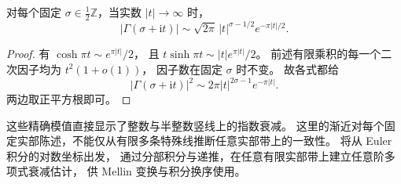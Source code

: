 \begin{corollary}[整数与半整数竖线的渐近]\label{b3:cor:21-half-integer-lines}
对每个固定 \(\sigma\in\tfrac12\mathbb Z\)，当实数 \(|t|\to\infty\) 时，
\[
 |\Gamma(\sigma+\mathrm it)|
 \sim\sqrt{2\pi}\,|t|^{\sigma-1/2}e^{-\pi|t|/2}.
\]
\end{corollary}
\begin{proof}
有 \(\cosh\pi t\sim e^{\pi|t|}/2\)，
且 \(t\sinh\pi t\sim|t|e^{\pi|t|}/2\)。
前述有限乘积的每一个二次因子均为 \(t^2(1+o(1))\)，
因子数在固定 \(\sigma\) 时不变。
故各式都给
\[
 |\Gamma(\sigma+\mathrm it)|^2
 \sim2\pi|t|^{2\sigma-1}e^{-\pi|t|}.
\]
两边取正平方根即可。
\end{proof}

这些精确模值直接显示了整数与半整数竖线上的指数衰减。
这里的渐近对每个固定实部陈述，不能仅从有限多条特殊线推断任意实部带上的一致性。
将从 Euler 积分的对数坐标出发，
通过分部积分与递推，在任意有限实部带上建立任意阶多项式衰减估计，
供 Mellin 变换与积分换序使用。
